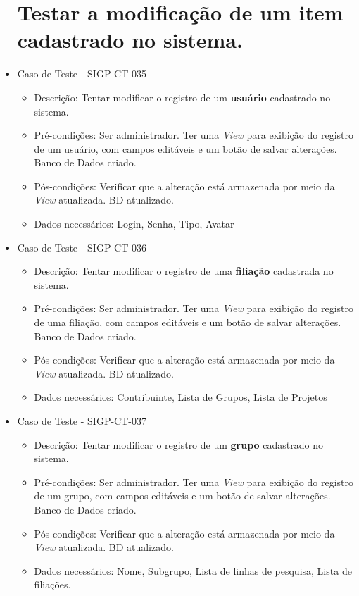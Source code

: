 \documentclass[11pt, a4paper]{book}
\begin{document}
\begin{itemize}
\section{Testar a modificação de um item cadastrado no sistema.}
	\item Caso de Teste - SIGP-CT-035
	\begin{itemize}
	\item Descrição: Tentar modificar o registro de um \textbf{usuário} cadastrado no sistema.
	\item Pré-condições: Ser administrador. Ter uma \emph{View} para exibição do registro de um usuário, com campos editáveis e um botão de salvar alterações. Banco de Dados criado.
	\item Pós-condições: Verificar que a alteração está armazenada por meio da \emph{View} atualizada. BD atualizado.
	\item Dados necessários: Login, Senha, Tipo, Avatar
	\end{itemize}


	\item  Caso de Teste - SIGP-CT-036
	\begin{itemize}
	\item Descrição: Tentar modificar o registro de uma \textbf{filiação} cadastrada no sistema.
	\item Pré-condições: Ser administrador. Ter uma \emph{View} para exibição do registro de uma filiação, com campos editáveis e um botão de salvar alterações. Banco de Dados criado.
	\item Pós-condições:  Verificar que a alteração está armazenada por meio da \emph{View} atualizada. BD atualizado.
	\item Dados necessários: Contribuinte, Lista de Grupos, Lista de Projetos
	\end{itemize}



	\item Caso de Teste - SIGP-CT-037
	\begin{itemize}
	\item Descrição: Tentar modificar o registro de um  \textbf{grupo} cadastrado no sistema.
	\item Pré-condições: Ser administrador. Ter uma \emph{View} para exibição do registro de um grupo, com campos editáveis e um botão de salvar alterações. Banco de Dados criado.
\item Pós-condições:  Verificar que a alteração está armazenada por meio da \emph{View} atualizada. BD atualizado.
	\item Dados necessários: Nome, Subgrupo, Lista de linhas de pesquisa, Lista de filiações.
	\end{itemize}


\end{itemize}
\end{document}
